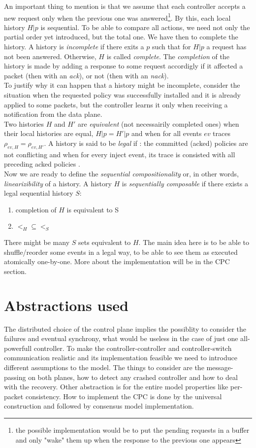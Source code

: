 \documentclass{article}
\theoremstyle{remark}
\begin{document}
An important thing to mention is that we assume that each controller accepts a new request only when the previous one was answered\footnote{the possible implementation would be to put the pending requests in a buffer and only "wake" them up when the response to the previous one appears}. By this, each local history $H|p$ is sequential.
To be able to compare all actions, we need not only the partial order yet introduced, but the total one. We have then to complete the history. A history is \emph{incomplete} if there exits a $p$ such that for $H|p$ a request has not been answered. Otherwise, $H$ is called \emph{complete}. The \emph{completion} of the history is made by adding a response to some request accordigly if it affected a packet (then with an \emph{ack}), or not (then with an \emph{nack}). \\
To justify why it can happen that a history might be incomplete, consider the situation when the requested policy was successfully installed and it is already applied to some packets, but the controller learns it only when receiving a notification from the data plane. \\
Two histories $H$ and $H'$ are \emph{equivalent} (not necessairily completed ones) when their local histories are equal, $H|p=H'|p$ and when for all events $ev$ traces $\rho_{ev,H}=\rho_{ev,H'}$.
A history is said to be \emph{legal} if : the committed (acked) policies are not conflicting and when for every inject event, its trace is consisted with all preceding acked policies \cite{CKLS15}.\\

Now we are ready to define the \emph{sequential compositionality} or, in other words, \emph{linearizibility} of a history. A history $H$ is \emph{sequentially composable} if there exists a legal sequential history $S$:
\begin{enumerate}
\item completion of $H$ is equivalent to S
\item $<_H\subseteq <_S$
\end{enumerate}
There might be many $S$ sets equivalent to $H$. The main idea here is to be able to shuffle/reorder some events in a legal way, to be able to see them as executed atomically one-by-one. More about the implementation  will be in the CPC section.

\section{Abstractions used}
The distributed choice of the control plane implies the possiblity to consider the failures and eventual synchrony, what would be useless in the case of just one all-powerfull controller. To make the controller-controller and controller-switch communication realistic and its implementation feasible we need to introduce different assumptions to the model. The things to consider are the message-passing on both planes, how to detect any crashed controller and how to deal with the recovery. Other abstraction is for the entire model properties like per-packet consistency. How to implement the CPC is done by the universal construction and followed by consensus model implementation. 
\end{document}
